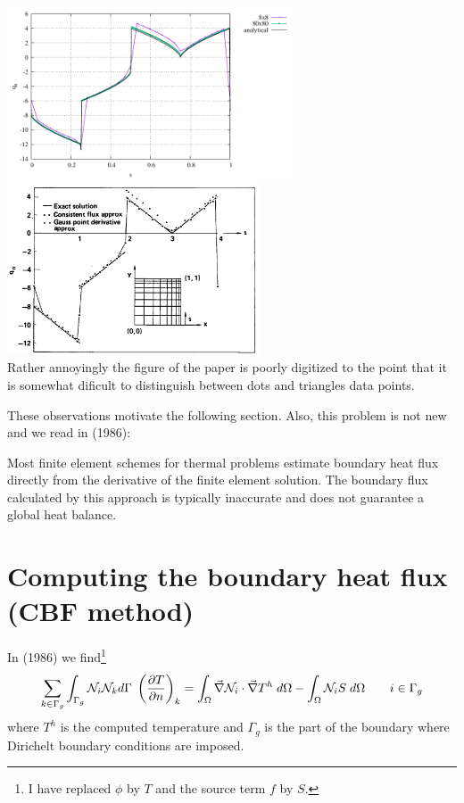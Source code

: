 \begin{center}
\includegraphics[width=8.5cm]{python_codes/fieldstone_173/results/exp1/heat_flux_boundary.pdf}
\includegraphics[width=7.5cm]{python_codes/fieldstone_173/images/grls87a}\\
{\captionfont Rather annoyingly the figure of the paper is poorly digitized 
to the point that it is somewhat dificult to distinguish between dots and triangles data points.}
\end{center}

These observations motivate the following section.
Also, this problem is not new and we read in \textcite{mizu86} (1986):
\begin{displayquote}
Most finite element schemes for thermal problems estimate boundary heat flux directly from the
derivative of the finite element solution. The boundary flux calculated by this approach is typically
inaccurate and does not guarantee a global heat balance.
\end{displayquote}

\section*{Computing the boundary heat flux (CBF method)}

In \textcite{mizu86} (1986) we find\footnote{I have replaced $\phi$ by $T$ and 
the source term $f$ by $S$.}
\[
\sum_{k \in \Gamma_g} \int_{\Gamma_g} {\mathcal{N}}_i {\mathcal{N}}_k d\Gamma \; 
\left(
\frac{\partial T}{\partial n}
\right)_k
=
\int_\Omega \vec\nabla {\mathcal{N}}_i \cdot \vec\nabla T^h \; d\Omega
- \int_\Omega {\mathcal{N}}_i S \; d\Omega
\qquad
i \in \Gamma_g
\]
where $T^h$ is the computed temperature and $\Gamma_g$ is the part of the 
boundary where Dirichelt boundary conditions are imposed.


